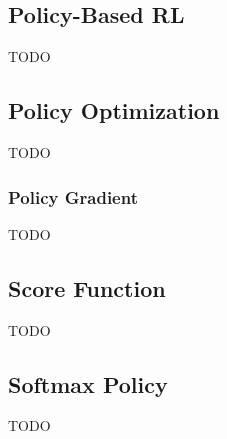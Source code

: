\subsection{Policy-Based RL}\label{subsec:policy-based-rl}
TODO

\subsection{Policy Optimization}\label{subsec:policy-optimization}
TODO

\subsubsection{Policy Gradient}\label{subsubsec:policy-gradient}
TODO



\subsection{Score Function}\label{subsec:score-function}
TODO

\subsection{Softmax Policy}\label{subsec:softmax-policy}
TODO

